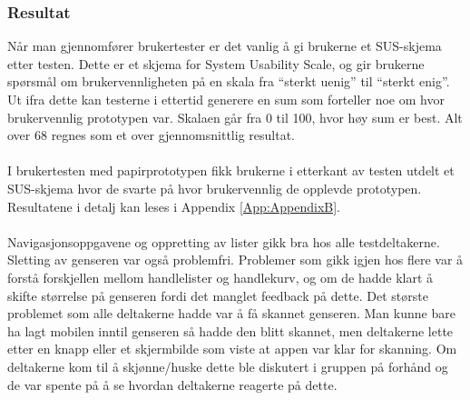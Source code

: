 \subsubsection{Resultat}
Når man gjennomfører brukertester er det vanlig å gi brukerne et SUS-skjema etter testen. Dette er et skjema for System Usability Scale, og gir brukerne spørsmål om brukervennligheten på en skala fra “sterkt uenig” til “sterkt enig”\cite{usability}. Ut ifra dette kan testerne i ettertid generere en sum som forteller noe om hvor brukervennlig prototypen var. Skalaen går fra 0 til 100, hvor høy sum er best. Alt over 68 regnes som et over gjennomsnittlig resultat.
\\\\
I brukertesten med papirprototypen fikk brukerne i etterkant av testen utdelt et SUS-skjema hvor de svarte på hvor brukervennlig de opplevde prototypen. Resultatene i detalj kan leses i Appendix \ref{App:AppendixB}.
\\\\
Navigasjonsoppgavene og oppretting av lister gikk bra hos alle testdeltakerne. Sletting av genseren var også problemfri. Problemer som gikk igjen hos flere var å forstå forskjellen mellom handlelister og handlekurv, og om de hadde klart å skifte størrelse på genseren fordi det manglet feedback på dette. Det største problemet som alle deltakerne hadde var å få skannet genseren. Man kunne bare ha lagt mobilen inntil genseren så hadde den blitt skannet, men deltakerne lette etter en knapp eller et skjermbilde som viste at appen var klar for skanning. Om deltakerne kom til å skjønne/huske dette ble diskutert i gruppen på forhånd og de var spente på å se hvordan deltakerne reagerte på dette.

